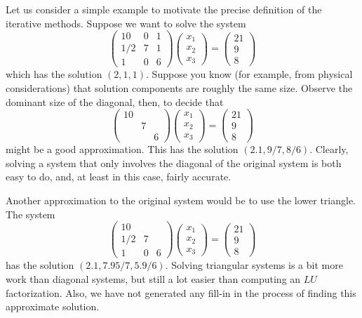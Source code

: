 Let us consider a simple example to motivate the precise definition of
the iterative methods. Suppose we want to solve the system
\[ \left(\begin{matrix}10&0&1\\ 1/2&7&1\\ 1&0&6\end{matrix}\right)
  \left(
    \begin{matrix}
      x_1\\ x_2\\ x_3
    \end{matrix}\right) = 
    \left(\begin{matrix}
      21\\ 9\\ 8
    \end{matrix}\right)
\]
which has the solution $(2,1,1)$.
%
Suppose you know (for example, from physical considerations) that
solution components are roughly the same size. Observe the
dominant size of the diagonal, then, to decide that
\[ \left(\begin{matrix}10&\\ &7\\ &&6\end{matrix}\right)
  \left(
    \begin{matrix}
      x_1\\ x_2\\ x_3
    \end{matrix}\right) = 
    \left(\begin{matrix}
      21\\ 9\\ 8
    \end{matrix}\right)
\]
might be a good approximation. This has the solution $(2.1,9/7,8/6)$. Clearly,
solving a system that only involves the diagonal of the original
system is both easy to do, and, at least in this case, fairly accurate.

Another approximation to the original system would be to use the lower
triangle. The system
\[ \left(\begin{matrix}10\\ 1/2&7\\ 1&0&6\end{matrix}\right)
  \left(
    \begin{matrix}
      x_1\\ x_2\\ x_3
    \end{matrix}\right) = 
    \left(\begin{matrix}
      21\\ 9\\ 8
    \end{matrix}\right)
\]
has the solution $(2.1,7.95/7,5.9/6)$. Solving triangular systems is a
bit more work than diagonal systems, but still a lot easier than
computing an $LU$ factorization. Also, we have not generated any fill-in
in the process of finding this approximate solution.

